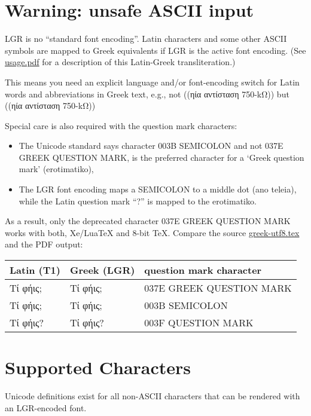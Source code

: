 \documentclass[a4paper]{scrartcl}
\begin{document}
\section{Warning: unsafe ASCII input}

LGR is no ``standard font encoding''. Latin characters and some other ASCII
symbols are mapped to Greek equivalents if LGR is the active font encoding.
(See
\href{http://mirrors.ctan.org/language/babel/contrib/greek/usage.pdf}{usage.pdf}
for a description of this Latin-Greek transliteration.)

This means you need an explicit language and/or font-encoding switch for
Latin words and abbreviations in Greek text, e.g., not
\foreignlanguage{greek}{((ηία αντίσταση 750-kΩ))} but
\foreignlanguage{greek}{((ηία αντίσταση 750-\textlatin{k}Ω))}

Special care is also required with the question mark characters:
\begin{itemize}
  \item The Unicode standard says character 003B SEMICOLON and not 037E GREEK
  	QUESTION MARK, is the preferred character for a `Greek question
	mark' (erotimatiko),
  \item The LGR font encoding maps a SEMICOLON to a middle dot (ano teleia),
	while the Latin question mark ``?'' is mapped to the erotimatiko.
\end{itemize}
As a result, only the deprecated character 037E GREEK QUESTION MARK works
with both, Xe/LuaTeX and 8-bit TeX. Compare the source \url{greek-utf8.tex}
and the PDF output:

\begin{center}
\begin{tabular}{lll}
  Latin (T1) & Greek (LGR) & question mark character \\
  \midrule
  Τί φήις; & \foreignlanguage{greek}{Τί φήις;} & 037E GREEK QUESTION MARK \\
  Τί φήις; & \foreignlanguage{greek}{Τί φήις;} & 003B SEMICOLON \\
  Τί φήις? & \foreignlanguage{greek}{Τί φήις?} & 003F QUESTION MARK \\
\end{tabular}
\end{center}


\section{Supported Characters}

Unicode definitions exist for all non-ASCII characters that can be rendered
with an LGR-encoded font.
\end{document}
